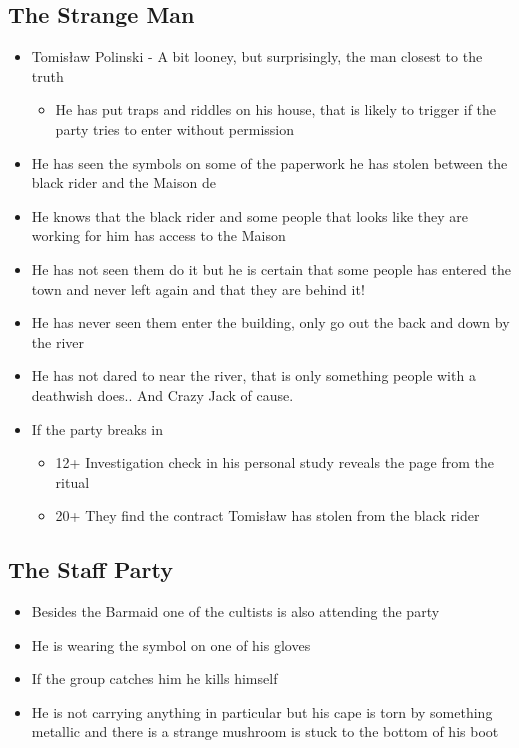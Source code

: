 \subsection*{The Strange Man}
\begin{itemize}
    \item Tomisław Polinski - A bit looney, but surprisingly, the man closest to the truth
    \begin{itemize}
        \item He has put traps and riddles on his house, that is likely to trigger if the party tries to enter without permission
    \end{itemize}
    \item He has seen the symbols on some of the paperwork he has stolen between the black rider and the Maison de
    \item He knows that the black rider and some people that looks like they are working for him has access to the Maison
    \item He has not seen them do it but he is certain that some people has entered the town and never left again and that they are behind it!
    \item He has never seen them enter the building, only go out the back and down by the river
    \item He has not dared to near the river, that is only something people with a deathwish does.. And Crazy Jack of cause.
    \item If the party breaks in
    \begin{itemize}
        \item 12+ Investigation check in his personal study reveals the page from the ritual
        \item 20+ They find the contract Tomisław has stolen from the black rider
    \end{itemize}
\end{itemize}

\subsection*{The Staff Party}
\begin{itemize}
    \item Besides the Barmaid one of the cultists is also attending the party
    \item He is wearing the symbol on one of his gloves
    \item If the group catches him he kills himself
    \item He is not carrying anything in particular but his cape is torn by something metallic and there is a strange mushroom is stuck to the bottom of his boot
\end{itemize}


